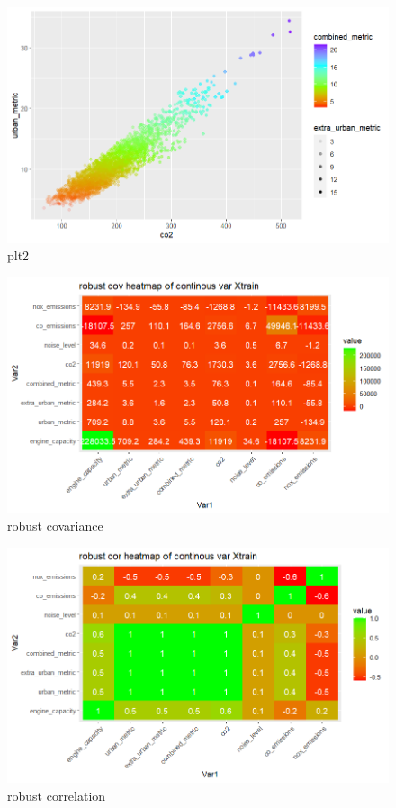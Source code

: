 \documentclass{article}
\begin{document}
\begin{figure}[h!]
        \centering
        \includegraphics[width=1.1\textwidth]{../plots/plt2.png}
        \caption{plt2}
        \label{fig:plt2}
\end{figure}   

\begin{figure}[h!]
        \centering
        \includegraphics[width=1.1\textwidth]{../plots/rob_cov.png}
        \caption{robust covariance}
        \label{fig:robcov}
\end{figure} 

\begin{figure}[h!]
        \centering
        \includegraphics[width=1.1\textwidth]{../plots/rob_cor.png}
        \caption{robust correlation}
        \label{fig:robcor}
\end{figure}
\end{document}
